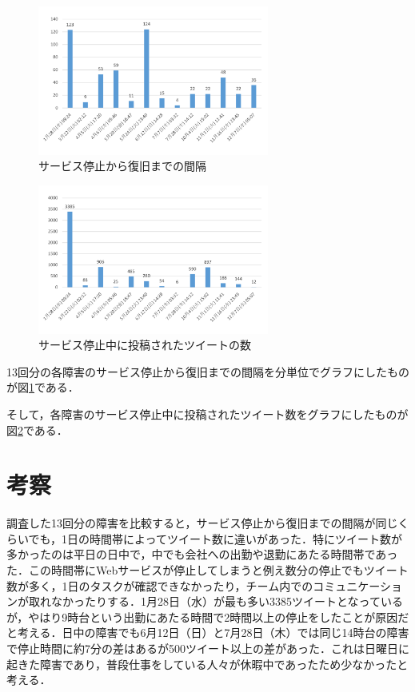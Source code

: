 \documentclass[uplatex,twocolumn]{jsarticle}
\begin{document}
\begin{figure}[H]
\includegraphics[width=7.6cm,clip]{graph1.pdf}
\caption{サービス停止から復旧までの間隔}\label{時間}
\end{figure}
\begin{figure}[H]
\includegraphics[width=7.6cm,clip]{graph2.pdf}
\caption{サービス停止中に投稿されたツイートの数}\label{ツイート数}
\end{figure}
13回分の各障害のサービス停止から復旧までの間隔を分単位でグラフにしたものが図\ref{時間}である．

そして，各障害のサービス停止中に投稿されたツイート数をグラフにしたものが図\ref{ツイート数}である．

\section{考察}
調査した13回分の障害を比較すると，サービス停止から復旧までの間隔が同じくらいでも，1日の時間帯によってツイート数に違いがあった．特にツイート数が多かったのは平日の日中で，中でも会社への出勤や退勤にあたる時間帯であった．この時間帯にWebサービスが停止してしまうと例え数分の停止でもツイート数が多く，1日のタスクが確認できなかったり，チーム内でのコミュニケーションが取れなかったりする．1月28日（水）が最も多い3385ツイートとなっているが，やはり9時台という出勤にあたる時間で2時間以上の停止をしたことが原因だと考える．日中の障害でも6月12日（日）と7月28日（木）では同じ14時台の障害で停止時間に約7分の差はあるが500ツイート以上の差があった．これは日曜日に起きた障害であり，普段仕事をしている人々が休暇中であったため少なかったと考える．
\end{document}
